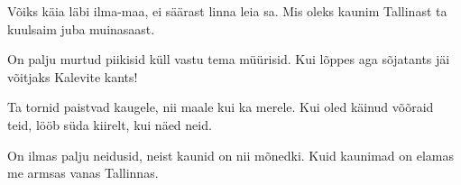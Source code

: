V\~oiks k\"aia l\"abi ilma-maa,
ei s\"a\"arast linna leia sa.
Mis oleks kaunim Tallinast
ta kuulsaim juba muinasaast.

On palju murtud piikisid
k\"ull vastu tema m\"u\"urisid.
Kui l\~oppes aga s\~ojatants
j\"ai v\~oitjaks Kalevite kants!

Ta tornid paistvad kaugele,
nii maale kui ka merele.
Kui oled k\"ainud v\~o\~oraid teid,
l\"o\"ob s\"uda kiirelt, kui n\"aed neid.

On ilmas palju neidusid,
neist kaunid on nii m\~onedki.
Kuid kaunimad on elamas
me armsas vanas Tallinnas.